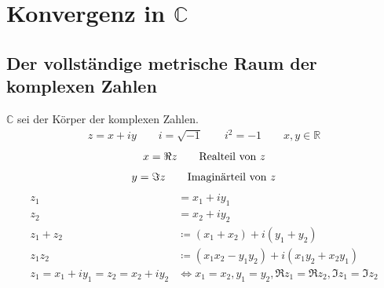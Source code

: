\documentclass[ngerman,titlepage,twoside, parskip=half*]{scrreprt}
\newcommand*{\R}{\mathbb{R}}
\newcommand*{\C}{\mathbb{C}}
\theoremstyle{break}
\theoremstyle{nonumberbreak}
\begin{document}
\section{Konvergenz in \texorpdfstring{$\C$}{C}}
\subsection{Der vollständige metrische Raum der komplexen Zahlen}

$\C$ sei der Körper der komplexen Zahlen.
\begin{gather*}z=x+iy \qquad i=\sqrt{-1} \qquad i^2=-1 \qquad x,y \in \R\end{gather*}
\begin{gather*}x=\Re z \qquad \text{Realteil\index{Realteil} von } z\end{gather*}
\begin{gather*}y=\Im z \qquad \text{Imaginärteil\index{Imaginärteil} von } z\end{gather*}
\begin{align*}
  z_1 & = x_1+iy_1\\
  z_2 & = x_2+iy_2\\
  z_1+z_2 & \coloneqq (x_1+x_2)+i(y_1+y_2)\\
  z_1z_2 & \coloneqq (x_1x_2-y_1y_2)+i(x_1y_2+x_2y_1)\\
  z_1=x_1+iy_1=z_2=x_2+iy_2 & \Leftrightarrow x_1=x_2, y_1=y_2, \Re z_1=\Re z_2, \Im z_1=\Im z_2
\end{align*}
\end{document}
